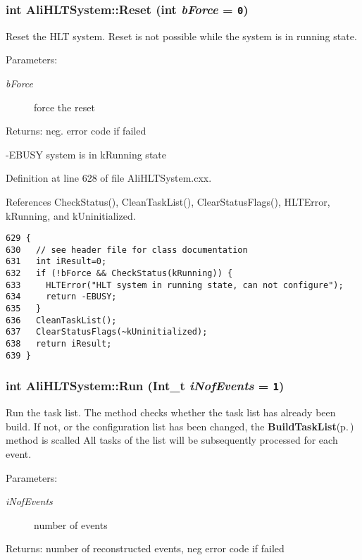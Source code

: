 \subsubsection{\setlength{\rightskip}{0pt plus 5cm}int Ali\-HLTSystem::Reset (int {\em b\-Force} = {\tt 0})}\label{classAliHLTSystem_a25}


Reset the HLT system. Reset is not possible while the system is in running state. \begin{Desc}
\item[Parameters:]
\begin{description}
\item[{\em b\-Force}]force the reset \end{description}
\end{Desc}
\begin{Desc}
\item[Returns:]neg. error code if failed \par
 -EBUSY system is in k\-Running state \par
 \end{Desc}


Definition at line 628 of file Ali\-HLTSystem.cxx.

References Check\-Status(), Clean\-Task\-List(), Clear\-Status\-Flags(), HLTError, k\-Running, and k\-Uninitialized.

\footnotesize\begin{verbatim}629 {
630   // see header file for class documentation
631   int iResult=0;
632   if (!bForce && CheckStatus(kRunning)) {
633     HLTError("HLT system in running state, can not configure");
634     return -EBUSY;
635   }
636   CleanTaskList();
637   ClearStatusFlags(~kUninitialized);
638   return iResult;
639 }
\end{verbatim}\normalsize 


\subsubsection{\setlength{\rightskip}{0pt plus 5cm}int Ali\-HLTSystem::Run (Int\_\-t {\em i\-Nof\-Events} = {\tt 1})}\label{classAliHLTSystem_a13}


Run the task list. The method checks whether the task list has already been build. If not, or the configuration list has been changed, the {\bf Build\-Task\-List}{\rm (p.\,\pageref{classAliHLTSystem_a7})} method is scalled All tasks of the list will be subsequently processed for each event. \begin{Desc}
\item[Parameters:]
\begin{description}
\item[{\em i\-Nof\-Events}]number of events \end{description}
\end{Desc}
\begin{Desc}
\item[Returns:]number of reconstructed events, neg error code if failed \end{Desc}


